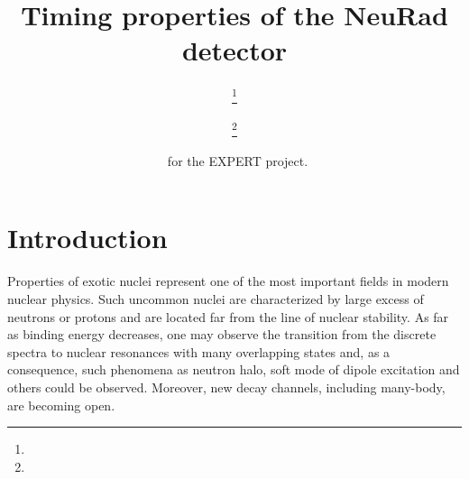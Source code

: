 \documentclass{webofc}
\begin{document}
\title{Timing properties of the NeuRad detector}

\author{ \fnsep\thanks{} \and
	 \fnsep\thanks{} \and
	  \and
	  \and
	  \and
	  \and
	  \and
	  \and
	  \and
	  \and
	  \ for the EXPERT project.
}
%
\maketitle
%
\section{Introduction}
Properties of exotic nuclei represent one of the most important fields in modern nuclear physics.
Such uncommon nuclei are characterized by large excess of neutrons or protons and are located far from the line of nuclear stability. As far as binding energy decreases, one may observe the transition from the discrete spectra to nuclear resonances with many overlapping states and, as a consequence, such phenomena as neutron halo, soft mode of dipole excitation and others could be observed. Moreover, new decay channels, including many-body, are becoming open.
\end{document}
